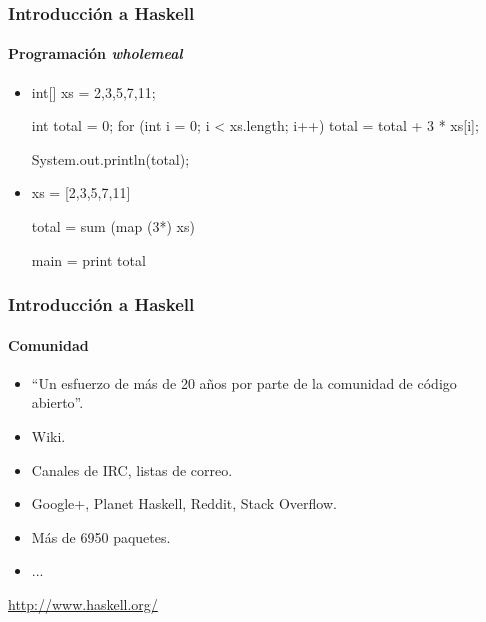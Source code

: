 \documentclass{beamer}
\begin{document}

\begin{frame}[fragile]
  \frametitle{Introducción a Haskell}
  \framesubtitle{Programación \emph{wholemeal}}

  \begin{itemize}
  \item[Java:]
    \small
    \begin{code}
int[] xs = {2,3,5,7,11};

int total = 0;
for (int i = 0; i < xs.length; i++) {
  total = total + 3 * xs[i];
}

System.out.println(total);
    \end{code}
    \normalsize
  \item[Haskell:]
    \small
    \begin{code}
xs = [2,3,5,7,11]

total = sum (map (3*) xs)

main = print total
    \end{code}
    \normalsize
  \end{itemize}
\end{frame}


\begin{frame}
  \frametitle{Introducción a Haskell}
  \framesubtitle{Comunidad}

  \begin{itemize}
  \item
    ``Un esfuerzo de más de 20 años por parte de la comunidad de
    código abierto''.
  \item
    Wiki.
  \item
    Canales de IRC, listas de correo.
  \item
    Google+, Planet Haskell, Reddit, Stack Overflow.
  \item
    Más de 6950 paquetes.
  \item
    ...
  \end{itemize}
  \vfill
  \begin{thebibliography}{Haskell}
    \url{http://www.haskell.org/}
  \end{thebibliography}
\end{frame}

\end{document}
